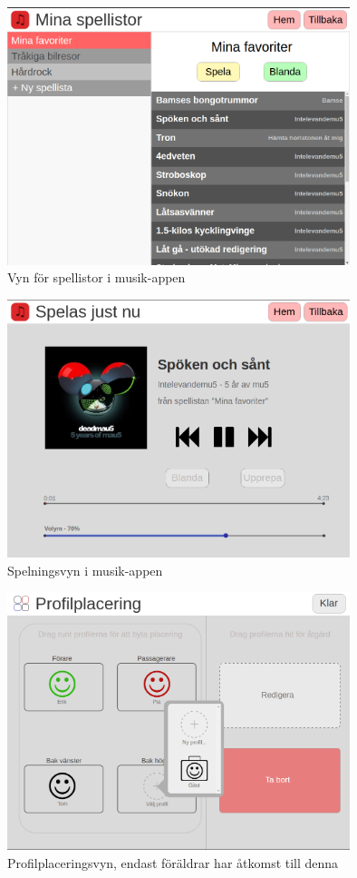 \documentclass[a4paper,12pt,titlepage]{article}
\begin{document}
\begin{figure}[h]
    \centering
    \includegraphics[width=10cm]{../screenshots/playlists.png}
    \caption{Vyn för spellistor i musik-appen}
\end{figure}

\begin{figure}[h]
    \centering
    \includegraphics[width=10cm]{../screenshots/player.png}
    \caption{Spelningsvyn i musik-appen}
\end{figure}

\begin{figure}[h]
    \centering
    \includegraphics[width=10cm]{../screenshots/profile_placement.png}
    \caption{Profilplaceringsvyn, endast föräldrar har åtkomst till denna}
\end{figure}
\end{document}
